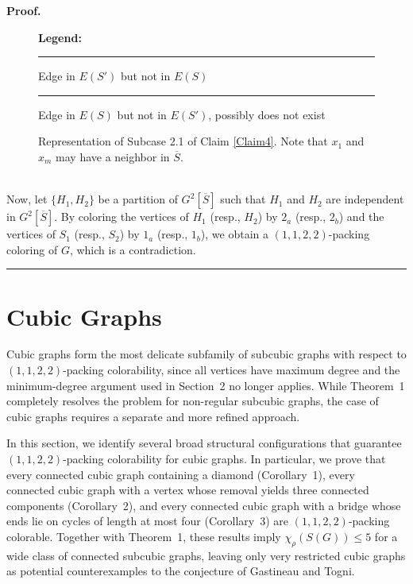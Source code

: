 \documentclass[12pt, oneside]{scrartcl}
\newenvironment{proof}[1][Proof]{\textbf{#1.} }{\ \rule{0.5em}{0.5em}}
\begin{document}
\begin{proof}
\begin{figure}[h!]
\begin{tikzpicture}
\end{tikzpicture}
\begin{minipage}[t]{0.5\textwidth}
\centering
\textbf{Legend:}\\
\textcolor{green}{\rule{10pt}{2pt}} \quad Edge in $E(S')$ but not in $E(S)$ \\
\textcolor{red}{\rule{10pt}{2pt}} \quad Edge in $E(S)$ but not in $E(S')$, possibly does not exist
\end{minipage}
\caption{Representation of Subcase 2.1 of Claim \ref{Claim4}. Note that $x_1$ and $x_m$ may have a neighbor in $\overline{S}$.}
\end{figure}
\\
Now, let $\{H_1,H_2\}$ be a partition of $G^2[\overline{S}]$ such that $H_1$ and $H_2$ are independent in $G^2[\overline{S}]$. By coloring the vertices of $H_1$ (resp., $H_2$) by $2_a$ (resp., $2_b$) and the vertices of $S_1$ (resp., $S_2$) by $1_a$ (resp., $1_b$), we obtain a $(1,1,2,2)$-packing coloring of $G$, which is a contradiction.
\end{proof}


\section{Cubic Graphs}
Cubic graphs form the most delicate subfamily of subcubic graphs with respect to $(1,1,2,2)$-packing colorability, since all vertices have maximum degree and the minimum-degree argument used in Section~2 no longer applies. While Theorem~1 completely resolves the problem for non-regular subcubic graphs, the case of cubic graphs requires a separate and more refined approach.

In this section, we identify several broad structural configurations that guarantee $(1,1,2,2)$-packing colorability for cubic graphs. In particular, we prove that every connected cubic graph containing a diamond (Corollary~1), every connected cubic graph with a vertex whose removal yields three connected components 
(Corollary~2), and every connected cubic graph with a bridge whose ends lie on cycles of length at most four (Corollary~3) are $(1,1,2,2)$-packing colorable. 
Together with Theorem~1, these results imply $\chi_\rho(S(G)) \leq 5$ for a wide class of connected subcubic graphs, leaving only very restricted cubic graphs as potential counterexamples to the conjecture of Gastineau and Togni.
\end{document}
